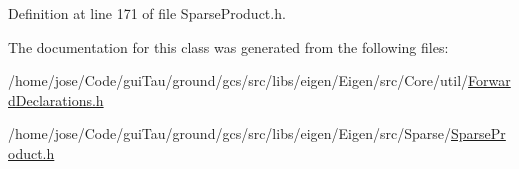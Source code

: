 Definition at line 171 of file Sparse\-Product.\-h.



The documentation for this class was generated from the following files\-:\begin{DoxyCompactItemize}
\item 
/home/jose/\-Code/gui\-Tau/ground/gcs/src/libs/eigen/\-Eigen/src/\-Core/util/\hyperlink{_forward_declarations_8h}{Forward\-Declarations.\-h}\item 
/home/jose/\-Code/gui\-Tau/ground/gcs/src/libs/eigen/\-Eigen/src/\-Sparse/\hyperlink{_sparse_product_8h}{Sparse\-Product.\-h}\end{DoxyCompactItemize}
